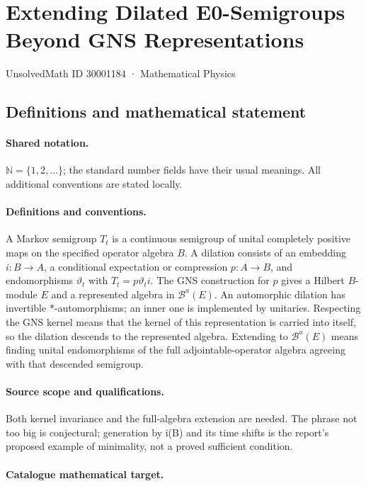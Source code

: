 \documentclass[11pt]{article}
\begin{document}
\setcounter{section}{30001183}
\section{Extending Dilated E0-Semigroups Beyond GNS Representations}\label{30001184}
{\small UnsolvedMath ID 30001184 · Mathematical Physics}
\subsection{Definitions and mathematical statement}

\paragraph{Shared notation.}$\mathbb N=\{1,2,\ldots\}$; the standard number fields have their usual meanings. All additional conventions are stated locally.


\paragraph{Definitions and conventions.} A Markov semigroup $T_t$ is a continuous semigroup of unital completely positive maps on the specified operator algebra $B$. A dilation consists of an embedding $i:B\to A$, a conditional expectation or compression $p:A\to B$, and endomorphisms $\vartheta_t$ with $T_t=p\vartheta_t i$. The GNS construction for $p$ gives a Hilbert $B$-module $E$ and a represented algebra in $\mathcal B^a(E)$. An automorphic dilation has invertible $*$-automorphisms; an inner one is implemented by unitaries. Respecting the GNS kernel means that the kernel of this representation is carried into itself, so the dilation descends to the represented algebra. Extending to $\mathcal B^a(E)$ means finding unital endomorphisms of the full adjointable-operator algebra agreeing with that descended semigroup.

\paragraph{Source scope and qualifications.} Both kernel invariance and the full-algebra extension are needed. The phrase not too big is conjectural; generation by i(B) and its time shifts is the report's proposed example of minimality, not a proved sufficient condition.

\paragraph{Catalogue mathematical target.}
\end{document}
